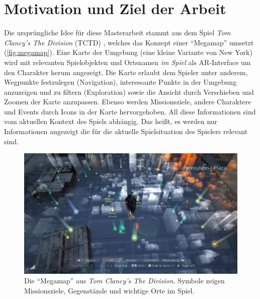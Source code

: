 \section{Motivation und Ziel der Arbeit}
\label{sec:motivation_ziel}
Die ursprüngliche Idee für diese Masterarbeit stammt aus dem Spiel \emph{Tom Clancy's The Division} (TCTD) \parencite{Ubisoft2018}, welches das Konzept einer \enquote{Megamap} umsetzt (\autoref{fig:megamap}).
Eine Karte der Umgebung (eine kleine Variante von New York) wird mit relevanten Spielobjekten und Ortsnamen \emph{im Spiel} als AR-Interface um den Charakter herum angezeigt.
Die Karte erlaubt dem Spieler unter anderem, Wegpunkte festzulegen (Navigation), interessante Punkte in der Umgebung anzuzeigen und zu filtern (Exploration) sowie die Ansicht durch Verschieben und Zoomen der Karte anzupassen.
Ebenso werden Missionsziele, andere Charaktere und Events durch Icons in der Karte hervorgehoben.
All diese Informationen sind vom aktuellen Kontext des Spiels abhängig.
Das heißt, es werden nur Informationen angezeigt die für die aktuelle Spielsituation des Spielers relevant sind.
\begin{figure}[t]
    \centering
    \includegraphics[width=\textwidth]{figures/the_division_megamap.jpg}
    \caption{Die \enquote{Megamap} aus \emph{Tom Clancy's The Division}. Symbole zeigen Missionsziele, Gegenstände und wichtige Orte im Spiel. }
    \label{fig:megamap}
\end{figure}

